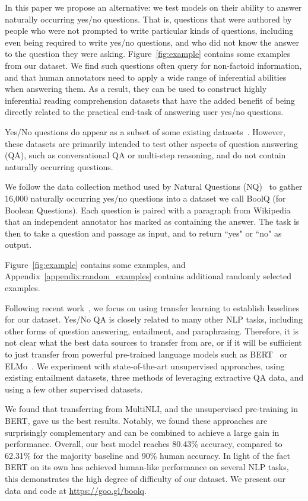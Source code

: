 In this paper we propose an alternative: we test models on their ability to answer naturally occurring yes/no questions. That is, questions that were authored by people who were not prompted to write particular kinds of questions, including even being required to write yes/no questions, and who did not know the answer to the question they were asking.
Figure~\ref{fig:example} contains some examples from our dataset. We find such questions often query for non-factoid information, and that human annotators need to apply a wide range of inferential abilities when answering them. As a result, they can be used to construct highly inferential reading comprehension datasets that have the added benefit of being directly related to the practical end-task of answering user yes/no questions.

Yes/No questions do appear as a subset of some existing datasets~\cite{coqa, quac, hotpotqa}. However, these datasets are primarily intended to test other aspects of question answering (QA), such as conversational QA or multi-step reasoning, and do not contain naturally occurring questions.

We follow the data collection method used by Natural Questions (NQ)~\cite{tnq} to gather 16,000 naturally occurring yes/no questions into a dataset we call BoolQ (for Boolean Questions). Each question is paired with a paragraph from Wikipedia that an independent annotator has marked as containing the answer. The task is then to take a question and passage as input, and to return ``yes" or ``no" as output.

Figure~\ref{fig:example} contains some examples, and Appendix~\ref{appendix:random_examples} contains additional randomly selected examples.

Following recent work~\cite{glue}, we focus on using transfer learning to establish baselines for our dataset. Yes/No QA is closely related to many other NLP tasks, including other forms of question answering, entailment, and paraphrasing. Therefore, it is not clear what the best data sources to transfer from are, or if it will be sufficient to just transfer from powerful pre-trained language models such as BERT~\cite{bert} or ELMo~\cite{elmo}. We experiment with state-of-the-art unsupervised approaches, using existing entailment datasets, three methods of leveraging extractive QA data, and using a few other supervised datasets.

We found that transferring from MultiNLI, and the unsupervised pre-training in BERT, gave us the best results. Notably, we found these approaches are surprisingly complementary and can be combined to achieve a large gain in performance. Overall, our best model reaches 80.43\% accuracy, compared to 62.31\% for the majority baseline and 90\% human accuracy. In light of the fact BERT on its own has achieved human-like performance on several NLP tasks, this demonstrates the high degree of difficulty of our dataset. We present our data and code at \url{https://goo.gl/boolq}.

